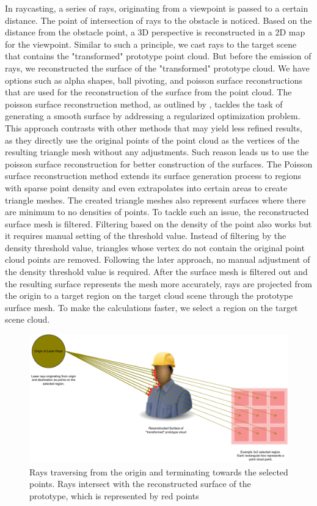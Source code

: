 In raycasting, a series of rays, originating from a viewpoint is passed to a certain distance. The point of intersection of rays to the obstacle is noticed. Based on the distance from the obstacle point, a 3D perspective is reconstructed in a 2D map for the viewpoint. Similar to such a principle, we cast rays to the target scene that contains the "transformed" prototype point cloud. But before the emission of rays, we reconstructed the surface of the "transformed" prototype cloud. We have options such as alpha shapes, ball pivoting, and poisson surface reconstructions that are used for the reconstruction of the surface from the point cloud. The poisson surface reconstruction method, as outlined by \parencite{kazhdan2006poisson}, tackles the task of generating a smooth surface by addressing a regularized optimization problem. This approach contrasts with other methods that may yield less refined results, as they directly use the original points of the point cloud as the vertices of the resulting triangle mesh without any adjustments. Such reason leads us to use the poisson surface reconstruction for better construction of the surfaces. The Poisson surface reconstruction method extends its surface generation process to regions with sparse point density and even extrapolates into certain areas to create triangle meshes. The created triangle meshes also represent surfaces where there are minimum to no densities of points. To tackle such an issue, the reconstructed surface mesh is filtered. Filtering based on the density of the point also works but it requires manual setting of the threshold value. Instead of filtering by the density threshold value, triangles whose vertex do not contain the original point cloud points are removed. Following the later approach, no manual adjustment of the density threshold value is required.
After the surface mesh is filtered out and the resulting surface represents the mesh more accurately, rays are projected from the origin to a target region on the target cloud scene through the prototype surface mesh. To make the calculations faster, we select a region on the target scene cloud.

\begin{figure}[htbp]
    \centering
    \includegraphics[width=1\linewidth]{97_graphics/concepts/raycasting.pdf}
    \caption{Rays traversing from the origin and terminating towards the selected points. Rays intersect with the reconstructed surface of the prototype, which is represented by red points}
    \label{fig:raycasting}
\end{figure}

